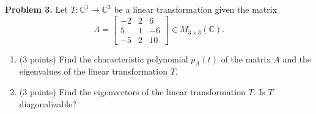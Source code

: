 \documentclass[11pt]{exam}
\begin{document}
{\bf Problem 3.} Let $T\colon \mathbb{C}^3 \to \mathbb{C}^3$ be a linear transformation given the matrix
$$A=\begin{bmatrix} -2 & 2 & 6 \\ 5 & 1 & -6 \\ -5 &2 &10 \end{bmatrix} \in M_{3\times 3}(\mathbb{C}). $$
\begin{enumerate}
\item (3 points) Find the characteristic polynomial $p_{A}(t)$ of the matrix $A$ and the eigenvalues of the linear transformation $T$.

\newpage
\item (3 points) Find the eigenvectors of the linear transformation $T$. Is $T$ diagonalizable?


\end{enumerate}
\end{document}

